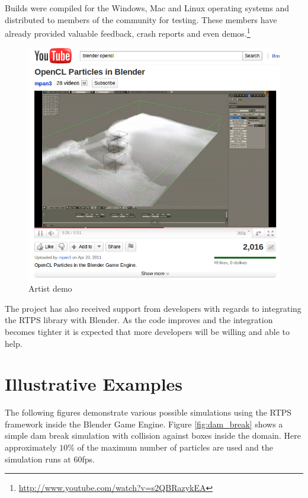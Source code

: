 Builds were compiled for the Windows, Mac and Linux operating systems and
distributed to members of the community for testing. These members have already
provided valuable feedback, crash reports and even demos.\footnote{ \url{http://www.youtube.com/watch?v=s2QBRazykEA}} 

\begin{figure}[!htc]
 		\centering
		\includegraphics[scale=0.75]{figures/youtube.png}
        \caption{ Artist demo }
		\label{fig:mpan}
\end{figure}

The project has also received support from developers with regards to
integrating the RTPS library with Blender. As the code improves and the
integration becomes tighter it is expected that more developers will be willing
and able to help.

\pagebreak

\section{Illustrative Examples}

The following figures demonstrate various possible simulations using the RTPS
framework inside the Blender Game Engine. Figure \ref{fig:dam_break} shows a
simple dam break simulation with collision against boxes inside the domain.
Here approximately $10\%$ of the maximum number of particles are used and the simulation runs at 60fps.

